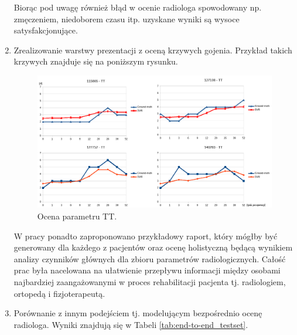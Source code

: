 \begin{enumerate}
	Biorąc pod uwagę również błąd w ocenie radiologa spowodowany np. zmęczeniem, niedoborem czasu itp. uzyskane wyniki są wysoce satysfakcjonujące.
	\item Zrealizowanie warstwy prezentacji z oceną krzywych gojenia. Przykład takich krzywych znajduje się na poniższym rysunku.
	 \begin{figure}[h!]
	 	\centering
	 	\includegraphics[width=1\textwidth]{figures/TT.png}
	 	\caption{Ocena parametru TT.}\label{fig:TT}
	 \end{figure}
 
 W pracy ponadto zaproponowano przykładowy raport, który mógłby być generowany dla każdego z pacjentów oraz ocenę holistyczną będącą wynikiem analizy czynników głównych dla zbioru parametrów radiologicznych. Całość prac była nacelowana na ułatwienie przepływu informacji między osobami najbardziej zaangażowanymi w proces rehabilitacji pacjenta tj. radiologiem, ortopedą i fizjoterapeutą.
 \item Porównanie z innym podejściem tj. modelującym bezpośrednio ocenę radiologa. Wyniki znajdują się w Tabeli \ref{tab:end-to-end_testset}.
 

\end{enumerate}
